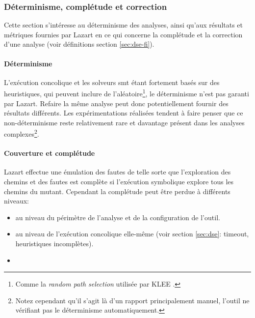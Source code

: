             \subsubsection{Déterminisme, complétude et correction}
                \label{sec:lz:exp:cov}
                
                Cette section s'intéresse au déterminisme des analyses, ainsi qu'aux résultats et métriques fournies par Lazart en ce qui concerne la complétude et la correction d'une analyse (voir définitions section \ref{sec:dse-fi}).
                
                \paragraph{Déterminisme}
                    L'exécution concolique et les solveurs \gls{smt} étant fortement basés sur des heuristiques, qui peuvent inclure de l'aléatoire\footnote{Comme la \textit{random path selection} utilisée par KLEE \cite{Cadar/OSDI08}.}, le déterminisme n'est pas garanti par Lazart.
                    Refaire la même analyse peut donc potentiellement fournir des résultats différents. Les expérimentations réalisées tendent à faire penser que ce non-déterminisme reste relativement rare et davantage présent dans les analyses complexes\footnote{Notez cependant qu'il s'agit là d'un rapport principalement manuel, l'outil ne vérifiant pas le déterminisme automatiquement.}.
                    
                    \paragraph{Couverture et complétude}
                    
                    Lazart effectue une émulation des fautes de telle sorte que l'exploration des chemins et des fautes est complète si l'exécution symbolique explore tous les chemins du mutant.
                    Cependant la complétude peut être perdue à différents niveaux:
                    \begin{itemize}
                        \item au niveau du périmètre de l'analyse et de la configuration de l'outil.
                        \item au niveau de l'exécution concolique elle-même (voir section \ref{sec:dse}: timeout, heuristiques incomplètes).
                        \item []
                    \end{itemize}
                
